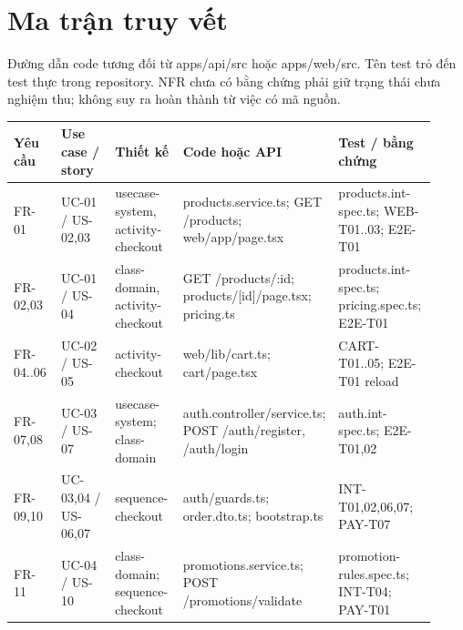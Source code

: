 \documentclass[a4paper,12pt,oneside]{report}
\begin{document}
\section{Ma trận truy vết}

Đường dẫn code tương đối từ {\small\ttfamily apps/\allowbreak{}api/\allowbreak{}src} hoặc {\small\ttfamily apps/\allowbreak{}web/\allowbreak{}src}. Tên test trỏ đến test thực trong repository. NFR chưa có bằng chứng phải giữ trạng thái chưa nghiệm thu; không suy ra hoàn thành từ việc có mã nguồn.


\begingroup\fontsize{9}{11}\selectfont\setlength{\tabcolsep}{3pt}\renewcommand{\arraystretch}{1.35}
\begin{longtable}{@{}>{\raggedright\arraybackslash}p{0.12\linewidth} >{\raggedright\arraybackslash}p{0.16\linewidth} >{\raggedright\arraybackslash}p{0.17\linewidth} >{\raggedright\arraybackslash}p{0.23\linewidth} >{\raggedright\arraybackslash}p{0.24\linewidth}@{}}
\toprule
\textbf{Yêu cầu} & \textbf{Use case /\allowbreak{} story} & \textbf{Thiết kế} & \textbf{Code hoặc API} & \textbf{Test /\allowbreak{} bằng chứng} \\
\midrule\endhead
FR-01 & UC-01 /\allowbreak{} US-02,03 & usecase-system, activity-checkout & products.service.ts; GET /\allowbreak{}products; web/\allowbreak{}app/\allowbreak{}page.tsx & products.int-spec.ts; WEB-T01..03; E2E-T01 \\
\addlinespace[2pt]
FR-02,03 & UC-01 /\allowbreak{} US-04 & class-domain, activity-checkout & GET /\allowbreak{}products/\allowbreak{}:id; products/\allowbreak{}[id]/\allowbreak{}page.tsx; pricing.ts & products.int-spec.ts; pricing.spec.ts; E2E-T01 \\
\addlinespace[2pt]
FR-04..06 & UC-02 /\allowbreak{} US-05 & activity-checkout & web/\allowbreak{}lib/\allowbreak{}cart.ts; cart/\allowbreak{}page.tsx & CART-T01..05; E2E-T01 reload \\
\addlinespace[2pt]
FR-07,08 & UC-03 /\allowbreak{} US-07 & usecase-system; class-domain & auth.controller/\allowbreak{}service.ts; POST /\allowbreak{}auth/\allowbreak{}register, /\allowbreak{}auth/\allowbreak{}login & auth.int-spec.ts; E2E-T01,02 \\
\addlinespace[2pt]
FR-09,10 & UC-03,04 /\allowbreak{} US-06,07 & sequence-checkout & auth/\allowbreak{}guards.ts; order.dto.ts; bootstrap.ts & INT-T01,02,06,07; PAY-T07 \\
\addlinespace[2pt]
FR-11 & UC-04 /\allowbreak{} US-10 & class-domain; sequence-checkout & promotions.service.ts; POST /\allowbreak{}promotions/\allowbreak{}validate & promotion-rules.spec.ts; INT-T04; PAY-T01 \\

\end{longtable}
\end{document}
